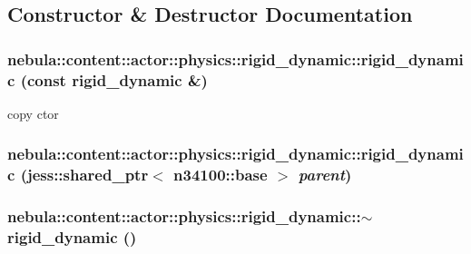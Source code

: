 \subsection{Constructor \& Destructor Documentation}
\hypertarget{classnebula_1_1content_1_1actor_1_1physics_1_1rigid__dynamic_a882b52f5aa77a31146bcb07b36abc44f}{
\subsubsection[{rigid\_\-dynamic}]{\setlength{\rightskip}{0pt plus 5cm}nebula::content::actor::physics::rigid\_\-dynamic::rigid\_\-dynamic (const {\bf rigid\_\-dynamic} \&)}}
\label{classnebula_1_1content_1_1actor_1_1physics_1_1rigid__dynamic_a882b52f5aa77a31146bcb07b36abc44f}


copy ctor \hypertarget{classnebula_1_1content_1_1actor_1_1physics_1_1rigid__dynamic_ae5ab0e6f758657ff8efd4725b3dca453}{
\subsubsection[{rigid\_\-dynamic}]{\setlength{\rightskip}{0pt plus 5cm}nebula::content::actor::physics::rigid\_\-dynamic::rigid\_\-dynamic (jess::shared\_\-ptr$<$ {\bf n34100::base} $>$ {\em parent})}}
\label{classnebula_1_1content_1_1actor_1_1physics_1_1rigid__dynamic_ae5ab0e6f758657ff8efd4725b3dca453}
\hypertarget{classnebula_1_1content_1_1actor_1_1physics_1_1rigid__dynamic_a34b5069d0913feb258ba55c4bb4196de}{
\subsubsection[{$\sim$rigid\_\-dynamic}]{\setlength{\rightskip}{0pt plus 5cm}nebula::content::actor::physics::rigid\_\-dynamic::$\sim$rigid\_\-dynamic ()}}
\label{classnebula_1_1content_1_1actor_1_1physics_1_1rigid__dynamic_a34b5069d0913feb258ba55c4bb4196de}


